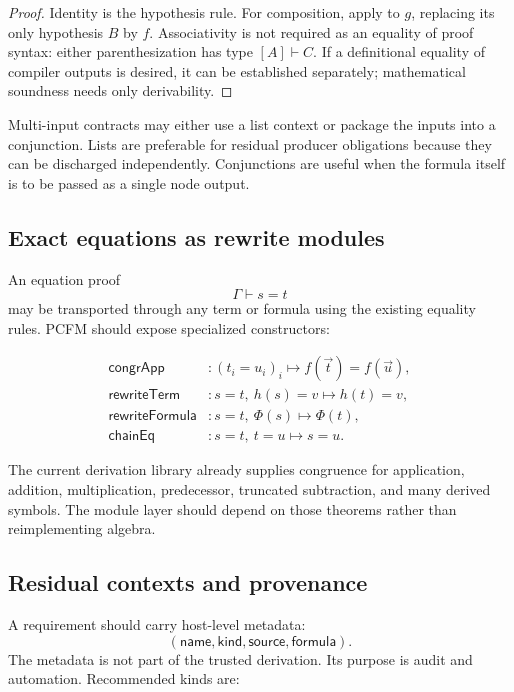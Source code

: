 \begin{proof}
Identity is the hypothesis rule.  For composition, apply
 to \(g\), replacing its only hypothesis \(B\) by \(f\).
Associativity is not required as an equality of proof syntax: either
parenthesization has type \([A]\vdash C\).  If a definitional equality of
compiler outputs is desired, it can be established separately; mathematical
soundness needs only derivability.
\end{proof}

Multi-input contracts may either use a list context or package the inputs into
a conjunction.  Lists are preferable for residual producer obligations
because they can be discharged independently.  Conjunctions are useful when
the formula itself is to be passed as a single node output.

\subsection{Exact equations as rewrite modules}

An equation proof
\[
   \Gamma\vdash s=t
\]
may be transported through any term or formula using the existing equality
rules.  PCFM should expose specialized constructors:

\[
\begin{array}{ll}
\mathsf{congrApp} &: (t_i=u_i)_i\mapsto f(\vec t)=f(\vec u),\\
\mathsf{rewriteTerm} &: s=t,\ h(s)=v\mapsto h(t)=v,\\
\mathsf{rewriteFormula} &: s=t,\ \Phi(s)\mapsto\Phi(t),\\
\mathsf{chainEq} &: s=t,\ t=u\mapsto s=u.
\end{array}
\]

The current derivation library already supplies congruence for application,
addition, multiplication, predecessor, truncated subtraction, and many
derived symbols.  The module layer should depend on those theorems rather than
reimplementing algebra.

\subsection{Residual contexts and provenance}

A requirement should carry host-level metadata:
\[
   (\mathsf{name},\mathsf{kind},\mathsf{source},\mathsf{formula}).
\]
The metadata is not part of the trusted derivation.  Its purpose is audit and
automation.  Recommended kinds are:

